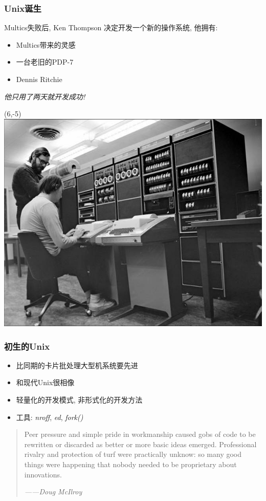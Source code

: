 \documentclass[compress]{beamer}
\begin{document}
\begin{frame}[t]
\frametitle{Unix诞生}
Multics失败后, Ken Thompson 决定开发一个新的操作系统, 他拥有:

\begin{itemize}
\item Multics带来的灵感
\item 一台老旧的PDP-7
\item Dennis Ritchie
\end{itemize}
\emph{他只用了两天就开发成功!}
\begin{textblock}{8}(6,-5)
\centering\includegraphics[width=0.8\hsize]{ken_dennis.jpg}\\
\end{textblock}
\end{frame}

\begin{frame}
\frametitle{初生的Unix}
\begin{itemize}
\item 比同期的卡片批处理大型机系统要先进
\item 和现代Unix很相像
\item 轻量化的开发模式, 非形式化的开发方法
\item 工具: \emph{nroff}, \emph{ed}, \emph{fork()}
\end{itemize}

\begin{quotation}\fontsize{10pt}{1.0em}\selectfont
Peer pressure and simple pride in workmanship caused gobs of code
to be rewritten or discarded as better or more basic ideas
emerged. Professional rivalry and protection of turf were
practically unknow: so many good things were happening that nobody
needed to be proprietary about innovations.
\begin{flushright}{\itshape ------Doug McIlroy}\end{flushright}
\end{quotation}

\end{frame}
\end{document}
